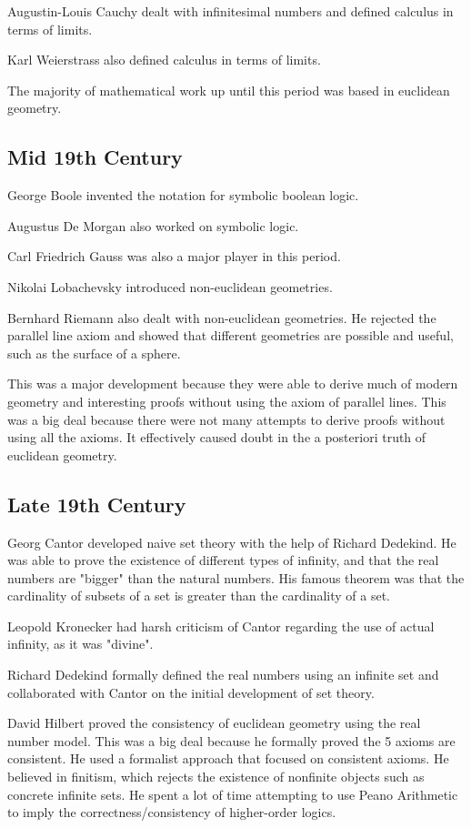 \documentclass{idc_msc}
\begin{document}
Augustin-Louis Cauchy dealt with infinitesimal numbers and defined calculus in terms of limits.

Karl Weierstrass also defined calculus in terms of limits.

The majority of mathematical work up until this period was based in euclidean geometry.

\subsection{Mid 19th Century}

George Boole invented the notation for symbolic boolean logic.

Augustus De Morgan also worked on symbolic logic.

Carl Friedrich Gauss was also a major player in this period.

Nikolai Lobachevsky introduced non-euclidean geometries.

Bernhard Riemann also dealt with non-euclidean geometries.
He rejected the parallel line axiom and showed that different geometries are possible and useful, such as the surface of a sphere.

This was a major development because they were able to derive much of modern geometry and interesting proofs without using the axiom of parallel lines.
This was a big deal because there were not many attempts to derive proofs without using all the axioms.
It effectively caused doubt in the a posteriori truth of euclidean geometry.

\subsection{Late 19th Century}

Georg Cantor developed naive set theory with the help of Richard Dedekind.
He was able to prove the existence of different types of infinity, and that the real numbers are "bigger" than the natural numbers.
His famous theorem was that the cardinality of subsets of a set is greater than the cardinality of a set.

Leopold Kronecker had harsh criticism of Cantor regarding the use of actual infinity, as it was "divine".

Richard Dedekind formally defined the real numbers using an infinite set and collaborated with Cantor on the initial development of set theory.

David Hilbert proved the consistency of euclidean geometry using the real number model.
This was a big deal because he formally proved the 5 axioms are consistent.
He used a formalist approach that focused on consistent axioms.
He believed in finitism, which rejects the existence of nonfinite objects such as concrete infinite sets.
He spent a lot of time attempting to use Peano Arithmetic to imply the correctness/consistency of higher-order logics.
\end{document}
